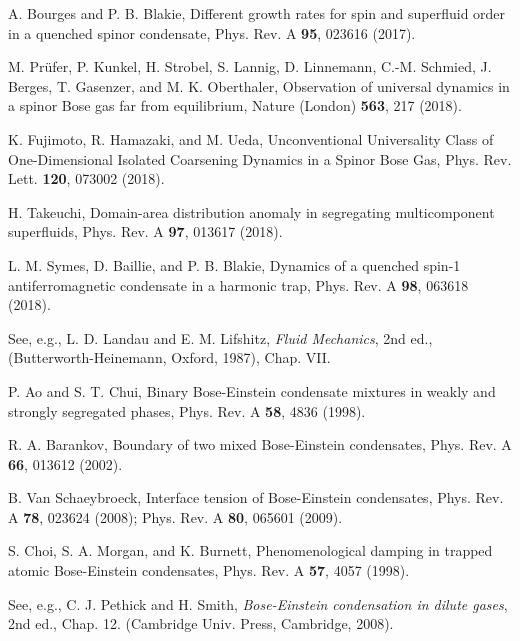 \documentclass[12pt,a4paper]{jbook}
\begin{document}
\begin{thebibliography}{99}
        A. Bourges and P. B. Blakie,
        Different growth rates for spin and superfluid order in a quenched spinor
        condensate,
        Phys. Rev. A \textbf{95}, 023616 (2017).
    
        M. Pr\"ufer, P. Kunkel, H. Strobel, S. Lannig, D. Linnemann, C.-M. Schmied,
        J. Berges, T. Gasenzer, and M. K. Oberthaler,
        Observation of universal dynamics in a spinor Bose gas far from equilibrium,
        Nature (London) \textbf{563}, 217 (2018).
    
        K. Fujimoto, R. Hamazaki, and M. Ueda,
        Unconventional Universality Class of One-Dimensional Isolated Coarsening
        Dynamics in a Spinor Bose Gas,
        Phys. Rev. Lett. \textbf{120}, 073002 (2018).
    
        H. Takeuchi,
        Domain-area distribution anomaly in segregating multicomponent superfluids,
        Phys. Rev. A \textbf{97}, 013617 (2018).
    
        L. M. Symes, D. Baillie, and P. B. Blakie,
        Dynamics of a quenched spin-1 antiferromagnetic condensate in a harmonic
        trap,
        Phys. Rev. A \textbf{98}, 063618 (2018).
    
        See, e.g., L. D. Landau and E. M. Lifshitz,
        {\it Fluid Mechanics}, 2nd ed.,
        (Butterworth-Heinemann, Oxford, 1987), Chap. VII.
    
        P. Ao and S. T. Chui,
        Binary Bose-Einstein condensate mixtures in weakly and strongly segregated
        phases,
        Phys. Rev. A \textbf{58}, 4836 (1998).
    
        R. A. Barankov,
        Boundary of two mixed Bose-Einstein condensates,
        Phys. Rev. A \textbf{66}, 013612 (2002).
    
        B. Van Schaeybroeck,
        Interface tension of Bose-Einstein condensates,
        Phys. Rev. A \textbf{78}, 023624 (2008);
        Phys. Rev. A \textbf{80}, 065601 (2009).
    
        S. Choi, S. A. Morgan, and K. Burnett,
        Phenomenological damping in trapped atomic Bose-Einstein condensates,
        Phys. Rev. A \textbf{57}, 4057 (1998).
    
        See, e.g., C. J. Pethick and H. Smith,
        {\it Bose-Einstein condensation in dilute gases},
        2nd ed., Chap. 12. (Cambridge Univ. Press, Cambridge, 2008).
    

\end{thebibliography}
\end{document}
